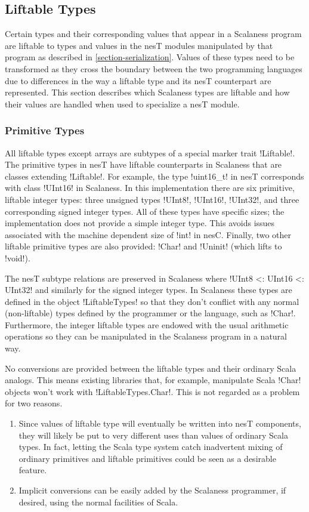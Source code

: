 \subsection{Liftable Types}
\label{section-liftable-types}

Certain types and their corresponding values that appear in a Scalaness program are liftable to
types and values in the nesT modules manipulated by that program as described in
\autoref{section-serialization}. Values of these types need to be transformed as they cross the
boundary between the two programming languages due to differences in the way a liftable type and
its nesT counterpart are represented. This section describes which Scalaness types are
liftable and how their values are handled when used to specialize a nesT module.

\subsubsection{Primitive Types}
\label{section-liftable-primitives}

All liftable types except arrays are subtypes of a special marker trait !Liftable!. The
primitive types in nesT have liftable counterparts in Scalaness that are classes extending
!Liftable!. For example, the type !uint16_t! in nesT corresponds with class !UInt16! in
Scalaness. In this implementation there are six primitive, liftable integer types: three unsigned
types !UInt8!, !UInt16!, !UInt32!, and three corresponding signed integer types. All of these
types have specific sizes; the implementation does not provide a simple integer type. This
avoids issues associated with the machine dependent size of !int! in nesC. Finally, two other
liftable primitive types are also provided: !Char! and !Uninit! (which lifts to !void!).

The nesT subtype relations are preserved in Scalaness where !UInt8 <: UInt16 <: UInt32! and
similarly for the signed integer types. In Scalaness these types are defined in the object
!LiftableTypes! so that they don't conflict with any normal (non-liftable) types defined by the
programmer or the language, such as !Char!. Furthermore, the integer liftable types are endowed
with the usual arithmetic operations so they can be manipulated in the Scalaness program in a
natural way.

No conversions are provided between the liftable types and their ordinary Scala analogs. This
means existing libraries that, for example, manipulate Scala !Char! objects won't work with
!LiftableTypes.Char!. This is not regarded as a problem for two reasons.
\begin{enumerate}
\item Since values of liftable type will eventually be written into nesT components, they will
  likely be put to very different uses than values of ordinary Scala types. In fact, letting the
  Scala type system catch inadvertent mixing of ordinary primitives and liftable primitives
  could be seen as a desirable feature.
\item Implicit conversions can be easily added by the Scalaness programmer, if desired, using the
  normal facilities of Scala.
\end{enumerate}

